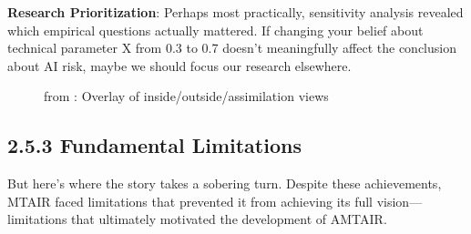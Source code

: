 \documentclass[
  11pt,
  letterpaper,
]{book}
\begin{document}
\textbf{Research Prioritization}: Perhaps most practically, sensitivity
analysis revealed which empirical questions actually mattered. If
changing your belief about technical parameter X from 0.3 to 0.7 doesn't
meaningfully affect the conclusion about AI risk, maybe we should focus
our research elsewhere.

\begin{figure}


\caption[Overlay of inside/outside/assimilation
views]{\label{fig-mtair-insideoutside-overlay}from
\textcite{manheim2021}: Overlay of inside/outside/assimilation views}

\end{figure}%

\subsection{2.5.3 Fundamental Limitations}\label{sec-mtair-limitations}

But here's where the story takes a sobering turn. Despite these
achievements, MTAIR faced limitations that prevented it from achieving
its full vision---limitations that ultimately motivated the development
of AMTAIR.
\end{document}
